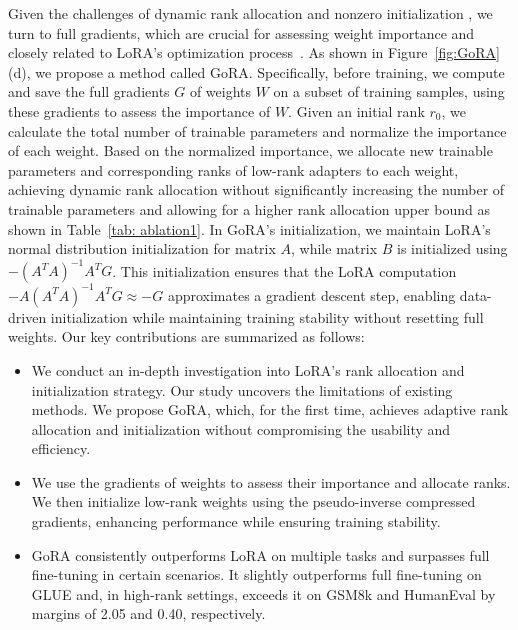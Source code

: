 Given the challenges of dynamic rank allocation and nonzero initialization , we turn to full gradients, which are crucial for assessing weight importance and closely related to LoRA's optimization process~\citep{hao2024flora, zhao2024galore}. As shown in Figure~\ref{fig:GoRA}(d), we propose a method called GoRA. Specifically, before training, we compute and save the full gradients \(G\) of weights \(W\) on a subset of training samples, using these gradients to assess the importance of \(W\). Given an initial rank \(r_0\), we calculate the total number of trainable parameters and normalize the importance of each weight. Based on the normalized importance, we allocate new trainable parameters and corresponding ranks of low-rank adapters to each weight, achieving dynamic rank allocation without significantly increasing the number of trainable parameters and allowing for a higher rank allocation upper bound as shown in Table~\ref{tab: ablation1}. In GoRA's initialization, we maintain LoRA's normal distribution initialization for matrix \(A\), while matrix \(B\) is initialized using \(-(A^TA)^{-1}A^TG\). This initialization ensures that the LoRA computation \( -A(A^TA)^{-1}A^TG \approx -G \) approximates a gradient descent step, enabling data-driven initialization while maintaining training stability without resetting full weights. Our key contributions are summarized as follows:
\begin{itemize}
    \item We conduct an in-depth investigation into LoRA's rank allocation and initialization strategy. Our study uncovers the limitations of existing methods. We propose GoRA, which, for the first time, achieves adaptive rank allocation and initialization without compromising the usability and efficiency.
    
    \item We use the gradients of weights to assess their importance and allocate ranks. We then initialize low-rank weights using the pseudo-inverse compressed gradients, enhancing 
    performance while ensuring training stability.
    
    \item GoRA consistently outperforms LoRA on multiple tasks and surpasses full fine-tuning in certain scenarios. It slightly outperforms full fine-tuning on GLUE and, in high-rank settings, exceeds it on GSM8k and HumanEval by margins of 2.05 and 0.40, respectively.
\end{itemize}


